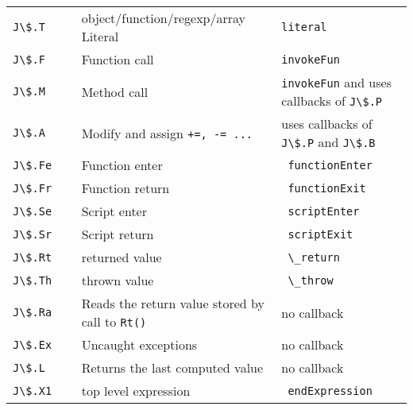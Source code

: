 \begin{table}[t]
{\begin{tabular}{l|l|l}
		{\lstinline|J\$.T           |} & object/function/regexp/array Literal                  &\lstinline|literal |                                \\
		{\lstinline|J\$.F           |} & Function call                                         &\lstinline|invokeFun|                               \\
    {\lstinline|J\$.M           |} & Method call                                           &\lstinline|invokeFun| and uses callbacks of {\lstinline|J\$.P|}   \\
		{\lstinline|J\$.A           |} & Modify and assign \lstinline|+=, -= ...|                          & uses callbacks of \lstinline|J\$.P| and \lstinline|J\$.B|       \\
		{\lstinline|J\$.Fe          |} & Function enter                                        &\lstinline| functionEnter |                          \\
		{\lstinline|J\$.Fr          |} & Function return                                       &\lstinline| functionExit  |                          \\
		{\lstinline|J\$.Se          |} & Script enter                                          &\lstinline| scriptEnter   |                          \\
		{\lstinline|J\$.Sr          |} & Script return                                         &\lstinline| scriptExit    |                          \\
		{\lstinline|J\$.Rt          |} & returned value                                        &\lstinline| \_return      |                          \\
		{\lstinline|J\$.Th          |} & thrown value                                          &\lstinline| \_throw       |                          \\
		{\lstinline|J\$.Ra          |} & Reads the return value stored by call to \lstinline|Rt()|         & no callback                             \\
		{\lstinline|J\$.Ex          |} & Uncaught exceptions                                   & no callback                             \\
		{\lstinline|J\$.L           |} & Returns the last computed value                       & no callback                             \\
		{\lstinline|J\$.X1          |} & top level expression                                  &\lstinline| endExpression               |            \\

\end{tabular}}
\end{table}
